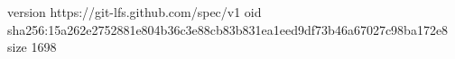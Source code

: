 version https://git-lfs.github.com/spec/v1
oid sha256:15a262e2752881e804b36c3e88cb83b831ea1eed9df73b46a67027c98ba172e8
size 1698

